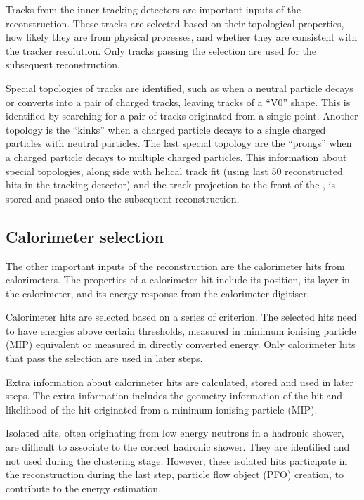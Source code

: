 Tracks from the inner tracking detectors are important inputs of the \pandora reconstruction. These tracks are selected based on their topological properties, how likely they are from physical processes, and whether they are consistent with the tracker resolution. Only tracks passing the selection are used for the subsequent reconstruction.

Special topologies of tracks are identified, such as when a neutral particle decays or converts into a pair of charged tracks, leaving tracks of a ``V0''  shape. This is identified by searching for a pair of tracks originated from a single point. Another topology is the ``kinks'' when a charged particle decays to a single charged particles with neutral particles. The last special topology are  the ``prongs'' when a charged particle decays to multiple charged particles. This information about special topologies, along side with helical track fit (using last 50 reconstructed hits in the tracking detector) and the track projection to the front of the \ECAL, is stored and passed onto the subsequent reconstruction.

\subsection{Calorimeter selection}

The other important inputs of  the \pandora reconstruction are the calorimeter hits from calorimeters. The properties of a calorimeter hit include its position, its layer in the calorimeter, and its energy response from the calorimeter digitiser.

Calorimeter hits are selected based on a series of criterion. The selected hits need to have energies above certain thresholds, measured in minimum ionising particle (MIP) equivalent or measured in directly converted energy. Only calorimeter hits that pass the selection are used in later steps.

Extra information about calorimeter hits are calculated, stored and used in later steps. The extra information includes the geometry information of the hit and likelihood of the hit originated from a minimum ionising particle (MIP).

Isolated hits, often originating from low energy neutrons in a hadronic shower, are difficult to associate to the correct hadronic shower. They are identified and not used during the clustering stage. However, these isolated hits participate in the reconstruction during the  last step, particle flow object (PFO) creation, to contribute to the energy estimation.


